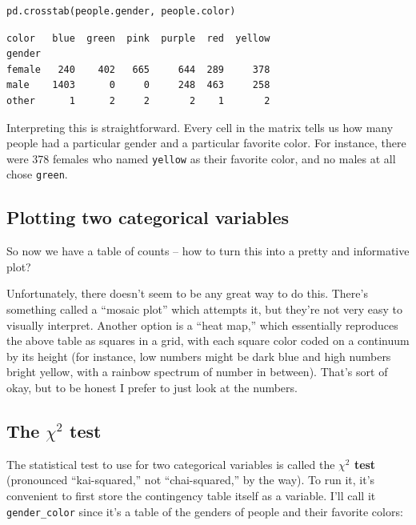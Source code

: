 \begin{Verbatim}[fontsize=\small,samepage=true,frame=single,framesep=3mm]
pd.crosstab(people.gender, people.color)
\end{Verbatim}
\vspace{-.2in}

\begin{Verbatim}[fontsize=\small,samepage=true,frame=leftline,framesep=5mm,framerule=1mm]
color   blue  green  pink  purple  red  yellow
gender                                        
female   240    402   665     644  289     378
male    1403      0     0     248  463     258
other      1      2     2       2    1       2
\end{Verbatim}

Interpreting this is straightforward. Every cell in the matrix tells us how
many people had a particular gender and a particular favorite color. For
instance, there were 378 females who named \texttt{yellow} as their favorite
color, and no males at all chose \texttt{green}.


\subsection{Plotting two categorical variables}

So now we have a table of counts -- how to turn this into a pretty and
informative plot?

Unfortunately, there doesn't seem to be any great way to do this. There's
something called a ``mosaic plot'' which attempts it, but they're not very easy
to visually interpret. Another option is a ``heat map,'' which essentially
reproduces the above table as squares in a grid, with each square color coded
on a continuum by its height (for instance, low numbers might be dark blue and
high numbers bright yellow, with a rainbow spectrum of number in between).
That's sort of okay, but to be honest I prefer to just look at the numbers.

\subsection{The $\chi^2$ test}


The statistical test to use for two categorical variables is called the
\textbf{$\chi^2$ test} (pronounced ``kai-squared,'' not ``chai-squared,'' by
the way). To run it, it's convenient to first store the contingency table
itself as a variable. I'll call it \texttt{gender\_color} since it's a table of
the genders of people and their favorite colors:

